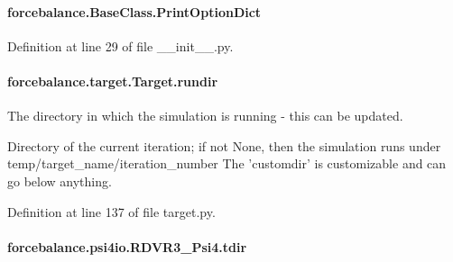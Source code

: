 \hypertarget{classforcebalance_1_1BaseClass_afc6659278497d7245bc492ecf405ccae}{
\paragraph[{Print\-Option\-Dict}]{\setlength{\rightskip}{0pt plus 5cm}forcebalance.\-Base\-Class.\-Print\-Option\-Dict\hspace{0.3cm}{\ttfamily [inherited]}}}\label{classforcebalance_1_1BaseClass_afc6659278497d7245bc492ecf405ccae}


Definition at line 29 of file \-\_\-\-\_\-init\-\_\-\-\_\-.\-py.

\hypertarget{classforcebalance_1_1target_1_1Target_a6872de5b2d4273b82336ea5b0da29c9e}{
\paragraph[{rundir}]{\setlength{\rightskip}{0pt plus 5cm}forcebalance.\-target.\-Target.\-rundir\hspace{0.3cm}{\ttfamily [inherited]}}}\label{classforcebalance_1_1target_1_1Target_a6872de5b2d4273b82336ea5b0da29c9e}


The directory in which the simulation is running -\/ this can be updated. 

Directory of the current iteration; if not None, then the simulation runs under temp/target\-\_\-name/iteration\-\_\-number The 'customdir' is customizable and can go below anything.

Definition at line 137 of file target.\-py.

\hypertarget{classforcebalance_1_1psi4io_1_1RDVR3__Psi4_afba333b01de406679320bd268435fd94}{
\paragraph[{tdir}]{\setlength{\rightskip}{0pt plus 5cm}forcebalance.\-psi4io.\-R\-D\-V\-R3\-\_\-\-Psi4.\-tdir}}\label{classforcebalance_1_1psi4io_1_1RDVR3__Psi4_afba333b01de406679320bd268435fd94}


